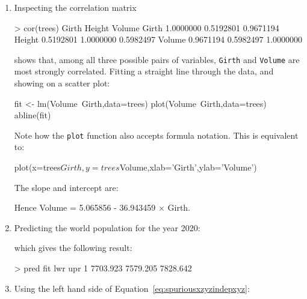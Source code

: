\begin{enumerate}

\item Inspecting the correlation matrix
  
\begin{script}
> cor(trees)
           Girth    Height    Volume
Girth  1.0000000 0.5192801 0.9671194
Height 0.5192801 1.0000000 0.5982497
Volume 0.9671194 0.5982497 1.0000000
\end{script}

\noindent shows that, among all three possible pairs of variables,
\texttt{Girth} and \texttt{Volume} are most strongly correlated.
Fitting a straight line through the data, and showing on a scatter
plot:

\begin{script}
fit <- lm(Volume~Girth,data=trees)
plot(Volume~Girth,data=trees)
abline(fit)
\end{script}

Note how the \texttt{plot} function also accepts formula
notation. This is equivalent to:

\begin{script}[firstnumber=2]
plot(x=trees$Girth,y=trees$Volume,xlab='Girth',ylab='Volume')
\end{script}
  
The slope and intercept are:


Hence Volume = 5.065856 - 36.943459 $\times$ Girth.

\item Predicting the world population for the year 2020:


\noindent which gives the following result:

\begin{console}
> pred
       fit      lwr      upr
1 7703.923 7579.205 7828.642
\end{console}

\item Using the left hand side of
  Equation~\ref{eq:spuriousxzyzindepxyz}:


\end{enumerate}
